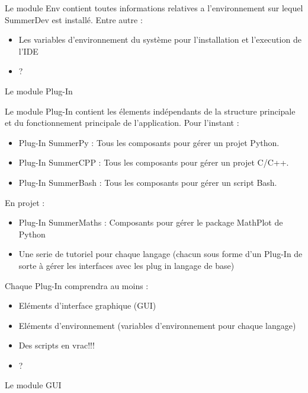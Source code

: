 \documentclass[a4paper,12pt]{article}
\begin{document}
Le module Env contient toutes informations relatives a l'environnement sur lequel SummerDev est installé.
Entre autre :
\begin{itemize}
\item Les variables d'environnement du système pour l'installation et l'execution de l'IDE
\item ?
\end{itemize}


\begin{center}
{\LARGE Le module Plug-In}
\end{center}

Le module Plug-In contient les élements indépendants de la structure principale et du fonctionnement principale de l'application.
Pour l'instant :
\begin{itemize}
\item Plug-In SummerPy : Tous les composants pour gérer un projet Python.
\item Plug-In SummerCPP : Tous les composants pour gérer un projet C/C++.
\item Plug-In SummerBash : Tous les composants pour gérer un script Bash.
\end{itemize}

En projet :
\begin{itemize}
\item Plug-In SummerMaths : Composants pour gérer le package MathPlot de Python
\item Une serie de tutoriel pour chaque langage (chacun sous forme d'un Plug-In de sorte à gérer les interfaces avec les plug in langage de base)
\end{itemize}

Chaque Plug-In comprendra au moins :
\begin{itemize}
\item Eléments d'interface graphique (GUI)
\item Eléments d'environnement (variables d'environnement pour chaque langage)
\item Des scripts en vrac!!!
\item ?
\end{itemize}


\begin{center}
{\LARGE Le module GUI}
\end{center}
\end{document}
